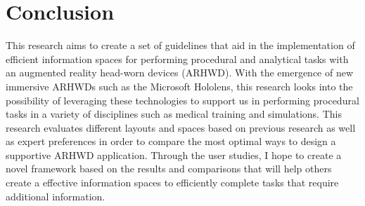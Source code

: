 \section{Conclusion}
\label{sec:conclusion}
	This research aims to create a set of guidelines that aid in the implementation of efficient information spaces for performing procedural and analytical tasks with an augmented reality head-worn devices (ARHWD). With the emergence of new immersive ARHWDs such as the Microsoft Hololens, this research looks into the possibility of leveraging these technologies to support us in performing procedural tasks in a variety of disciplines such as medical training and simulations. This research evaluates different layouts and spaces based on previous research as well as expert preferences in order to compare the most optimal ways to design a supportive ARHWD application. Through the user studies, I hope to create a novel framework based on the results and comparisons that will help others create a effective information spaces to efficiently complete tasks that require additional information.
